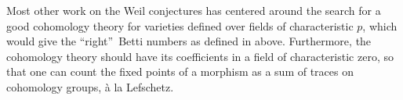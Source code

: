 {

Most other work on the Weil conjectures has centered around the search for a good cohomology theory for varieties defined over fields of characteristic $p$, which would give the \textquotedblleft right\textquotedblright\ Betti numbers as defined in  above. Furthermore, the cohomology theory should have its coefficients in a field of characteristic zero, so that one can count the fixed points of a morphism as a sum of traces on cohomology groups, \`a la Lefschetz.
}
